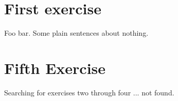 \documentclass[a4paper,parskip,headheight=38pt]{scrartcl} %
\begin{document}
\section*{First exercise}

Foo bar. Some plain sentences about nothing.


\section*{Fifth Exercise}

Searching for exercises two through four ... not found.
\end{document}
